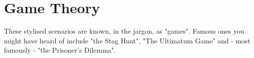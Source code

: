 \chapter{Game Theory}
 
 These stylised scenarios are known, in the jargon, as "games". Famous ones you might have heard of include "the Stag Hunt", "The Ultimatum Game" and - most famously - "the Prisoner's Dilemma".